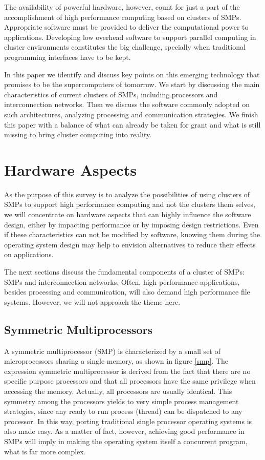 	The availability of powerful hardware, however, count for just a part of the accomplishment of high performance computing based on clusters of SMPs. Appropriate software must be provided to deliver the computational power to applications. Developing low overhead software to support parallel computing in cluster environments constitutes the big challenge, specially when traditional programming interfaces have to be kept.

	In this paper we identify and discuss key points on this emerging technology that promises to be the supercomputers of tomorrow. We start by discussing the main characteristics of current clusters of SMPs, including processors and interconnection networks. Then we discuss the software commonly adopted on such architectures, analyzing processing and communication strategies. We finish this paper with a balance of what can already be taken for grant and what is still missing to bring cluster computing into reality.  
	

\section{\label{hard}Hardware Aspects}

	As the purpose of this survey is to analyze the possibilities of using clusters of SMPs to support high performance computing and not the clusters  them selves, we will concentrate on hardware aspects that can highly influence the software design, either by impacting performance or by imposing design restrictions. Even if these characteristics can not be modified by software, knowing them during the operating system design may help to envision alternatives to reduce their effects on applications.

	The next sections discuss the fundamental components of a cluster of SMPs: SMPs and interconnection networks. Often, high performance applications, besides processing and communication, will also demand high performance file systems. However, we will not approach the theme here. 
	

\subsection{\label{hard_proc}Symmetric Multiprocessors}

	A symmetric multiprocessor (SMP) is characterized by a small set of microprocessors sharing a single memory, as shown in figure \ref{smp}. The expression symmetric multiprocessor is derived from the fact that there are no specific purpose processors and that  all processors have the same privilege when accessing the memory. Actually, all processors are usually identical. This symmetry among the processors yields to very simple process management strategies, since any ready to run process (thread) can be dispatched to any processor. In this way, porting traditional single processor operating systems is also made easy. As a matter of fact, however, achieving good performance in  SMPs will imply in making the operating system itself a concurrent program, what is far more complex.

